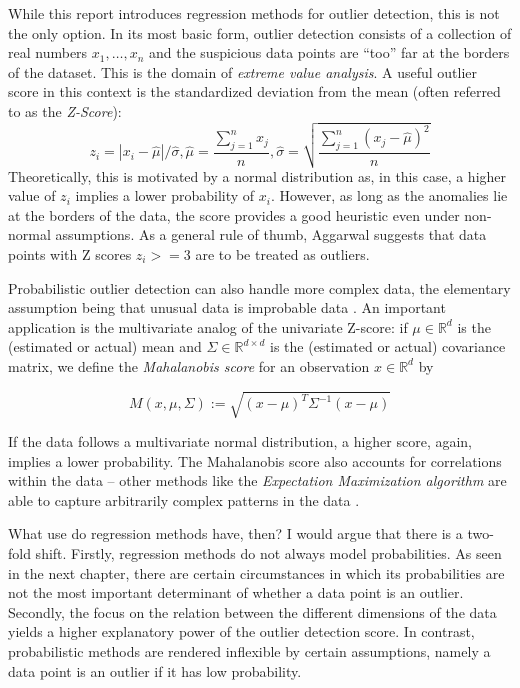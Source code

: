 \documentclass[]{report}
\theoremstyle{definition}
\theoremstyle{definition}
\theoremstyle{definition}
\theoremstyle{remark}
\begin{document}
While this report introduces regression methods for outlier detection,
this is not the only option. In its most basic form, outlier detection
consists of a collection of real numbers \(x_1,\dotsc, x_n\) and the
suspicious data points are ``too'' far at the borders of the dataset.
This is the domain of \emph{extreme value analysis}. A useful outlier
score in this context is the standardized deviation from the mean (often
referred to as the \emph{Z-Score}):
\[z_i=|x_i-\hat{\mu}|/\hat{\sigma}, \hat{\mu}=\frac{\sum_{j=1}^nx_j}{n}, \hat{\sigma}=\sqrt{\frac{\sum_{j=1}^n(x_j-\hat{\mu})^2}{n}}\]
Theoretically, this is motivated by a normal distribution as, in this
case, a higher value of \(z_i\) implies a lower probability of \(x_i\).
However, as long as the anomalies lie at the borders of the data, the
score provides a good heuristic even under non-normal assumptions. As a
general rule of thumb, Aggarwal suggests that data points with Z scores
\(z_i>=3\) are to be treated as outliers. \citep[p.~6]{Aggarwal2017}

Probabilistic outlier detection can also handle more complex data, the
elementary assumption being that unusual data is improbable data
\citep[for a general introduction, see][ch.~2]{Aggarwal2017}. An
important application is the multivariate analog of the univariate
Z-score: if \(\mu\in\mathbb{R}^d\) is the (estimated or actual) mean and
\(\Sigma\in\mathbb{R}^{d\times d}\) is the (estimated or actual)
covariance matrix, we define the \emph{Mahalanobis score} for an
observation \(x\in\mathbb{R}^d\) by

\[M(x,\mu,\Sigma):=\sqrt{(x-\mu)^T\Sigma^{-1}(x-\mu)}\]

If the data follows a multivariate normal distribution, a higher score,
again, implies a lower probability. The Mahalanobis score also accounts
for correlations within the data -- other methods like the
\emph{Expectation Maximization algorithm} are able to capture
arbitrarily complex patterns in the data \citep{Dempster1977}.

What use do regression methods have, then? I would argue that there is a
two-fold shift. Firstly, regression methods do not always model
probabilities. As seen in the next chapter, there are certain
circumstances in which its probabilities are not the most important
determinant of whether a data point is an outlier. Secondly, the focus
on the relation between the different dimensions of the data yields a
higher explanatory power of the outlier detection score. In contrast,
probabilistic methods are rendered inflexible by certain assumptions,
namely a data point is an outlier if it has low probability.
\end{document}
